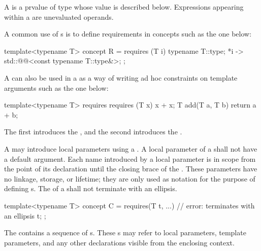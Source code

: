 \pnum
A  is a prvalue of type 
whose value is described below.
Expressions appearing within a 
are unevaluated operands.

\pnum
\begin{example}
A common use of s is to define
requirements in concepts such as the one below:
\begin{codeblock}
template<typename T>
  concept R = requires (T i) {
    typename T::type;
    {*i} -> std::@@<const typename T::type&>;
  };
\end{codeblock}
A  can also be used in a
 as a way of writing ad hoc
constraints on template arguments such as the one below:
\begin{codeblock}
template<typename T>
  requires requires (T x) { x + x; }
    T add(T a, T b) { return a + b; }
\end{codeblock}
The first  introduces the
, and the second
introduces the .
\end{example}

\pnum
A  may introduce local parameters using a
.
A local parameter of a  shall not have a
default argument.
Each name introduced by a local parameter is in scope from the point
of its declaration until the closing brace of the
.
These parameters have no linkage, storage, or lifetime; they are only used
as notation for the purpose of defining s.
The  of a
shall not terminate with an ellipsis.
\begin{example}
\begin{codeblock}
template<typename T>
concept C = requires(T t, ...) {    // error: terminates with an ellipsis
  t;
};
\end{codeblock}
\end{example}

\pnum
{}%
The  contains
a sequence of s.
These s may refer to local
parameters, template parameters, and any other declarations visible from the
enclosing context.

